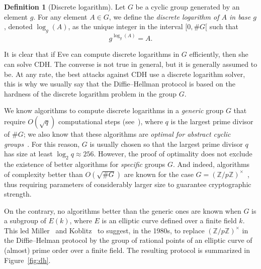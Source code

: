 \documentclass[10pt]{article}
\theoremstyle{plain}
\theoremstyle{definition}
\newtheorem{definition}[theorem]{Definition}
\begin{document}
\begin{definition}[Discrete logarithm]
  Let $G$ be a cyclic group generated by an element $g$. For any
  element $A∈G$, we define the \emph{discrete logarithm of $A$ in base
    $g$}, denoted $\log_g(A)$, as the unique integer in the interval
  $[0,\#G[$ such that
  \[g^{\log_g(A)} = A.\]
\end{definition}

It is clear that if Eve can compute discrete logarithms in $G$
efficiently, then she can solve CDH. %
The converse is not true in general, but it is generally assumed to
be. %
At any rate, the best attacks against CDH use a discrete logarithm
solver, this is why we usually say that the Diffie--Hellman protocol
is based on the hardness of the discrete logarithm problem in the
group $G$.

We know algorithms to compute discrete logarithms in a \emph{generic}
group $G$ that require $O(\sqrt{q})$ computational steps
(see~\cite{joux2009algorithmic}), where $q$ is the largest prime
divisor of $\#G$; we also know that these algorithms are \emph{optimal
  for abstract cyclic groups}~\cite{EC:Shoup97}. %
For this reason, $G$ is usually chosen so that the largest prime
divisor $q$ has size at least $\log_2 q ≈ 256$. %
However, the proof of optimality does not exclude the existence of
better algorithms for \emph{specific} groups $G$. %
And indeed, algorithms of complexity better than $O(\sqrt{\#G})$ are
known for the case $G=(ℤ/pℤ)^{×}$~\cite{joux2009algorithmic}, thus
requiring parameters of considerably larger size to guarantee
cryptographic strength.

On the contrary, no algorithms better than the generic ones are known
when $G$ is a subgroup of $E(k)$, where $E$ is an elliptic curve
defined over a finite field $k$. %
This led Miller~\cite{C:Miller85} and
Koblitz~\cite{koblitz87,JC:Koblitz89} to suggest, in the 1980s, to
replace $(ℤ/pℤ)^{×}$ in the Diffie--Helman protocol by the group of
rational points of an elliptic curve of (almost) prime order over a
finite field. %
The resulting protocol is summarized in Figure~\ref{fig:dh}.
\end{document}
